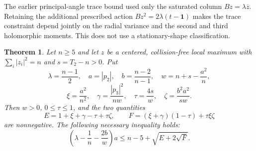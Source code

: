 \documentclass[11pt]{article}
\newtheorem{theorem}{Theorem}[section]
\theoremstyle{remark}
\numberwithin{equation}{section}
\begin{document}
The earlier principal-angle trace bound used only the saturated column
$Bz=\lambda\overline z$. Retaining the additional prescribed action
$Bz^2=2\lambda(t-\mathbf1)$ makes the trace constraint depend jointly
on the radial variance and the second and third holomorphic moments.
This does not use a stationary-shape classification.

\begin{theorem}\label{thm:noorigin-oct8-coupled-trace}
Let $n\ge5$ and let $z$ be a centered, collision-free local maximum
with $\sum_i|z_i|^2=n$ and $s=T_2-n>0$. Put
\[
 \lambda=\frac{n-1}{2},\quad a=|p_2|,\quad
 b=\frac{n-2}{n-1},\quad w=n+s-\frac{a^2}{n},
\]
\[
 \xi=\frac{a^2}{n^2},\quad
 \gamma=\frac{|p_3|^2}{nw},\quad
 \tau=\frac{4s}{w},\quad
 \zeta=\frac{b^2a^2}{sw}.
\]
Then $w>0$, $0\le\tau\le1$, and the two quantities
\[
 E=1+\xi+\gamma-\tau+\tau\zeta,\qquad
 F=(\xi+\gamma)(1-\tau)+\tau\xi\zeta
\]
are nonnegative. The following necessary inequality holds:
\begin{equation}\label{eq:noorigin-oct8-coupled-trace}
 \left(\lambda-\frac1n-\frac{2b}{w}\right)a
       \le n-5+\sqrt{E+2\sqrt F}.
\end{equation}
\end{theorem}
\end{document}
